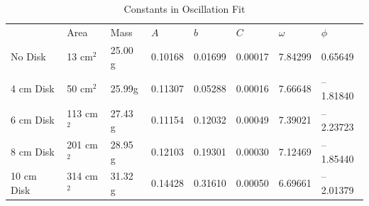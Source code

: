 \documentclass[12pt,letterpaper]{article}
\begin{document}
\begin{table}[ht]
\centering
\begin{tabular}{llllllll}
                                & Area                            & Mass                         & $A$                          & $b$                          & $C$                          & $\omega$                     & $\phi$                        \\ \cline{2-8} 
\multicolumn{1}{l|}{No Disk}    & \multicolumn{1}{l|}{13 cm$^2$}  & \multicolumn{1}{l|}{25.00 g} & \multicolumn{1}{l|}{0.10168} & \multicolumn{1}{l|}{0.01699} & \multicolumn{1}{l|}{0.00017} & \multicolumn{1}{l|}{7.84299} & \multicolumn{1}{l|}{0.65649}  \\ \cline{2-8} 
\multicolumn{1}{l|}{4 cm Disk}  & \multicolumn{1}{l|}{50 cm$^2$}  & \multicolumn{1}{l|}{25.99g}  & \multicolumn{1}{l|}{0.11307} & \multicolumn{1}{l|}{0.05288} & \multicolumn{1}{l|}{0.00016} & \multicolumn{1}{l|}{7.66648} & \multicolumn{1}{l|}{–1.81840} \\ \cline{2-8} 
\multicolumn{1}{l|}{6 cm Disk}  & \multicolumn{1}{l|}{113 cm$^2$} & \multicolumn{1}{l|}{27.43 g} & \multicolumn{1}{l|}{0.11154} & \multicolumn{1}{l|}{0.12032} & \multicolumn{1}{l|}{0.00049} & \multicolumn{1}{l|}{7.39021} & \multicolumn{1}{l|}{–2.23723} \\ \cline{2-8} 
\multicolumn{1}{l|}{8 cm Disk}  & \multicolumn{1}{l|}{201 cm$^2$} & \multicolumn{1}{l|}{28.95 g} & \multicolumn{1}{l|}{0.12103} & \multicolumn{1}{l|}{0.19301} & \multicolumn{1}{l|}{0.00030} & \multicolumn{1}{l|}{7.12469} & \multicolumn{1}{l|}{–1.85440} \\ \cline{2-8} 
\multicolumn{1}{l|}{10 cm Disk} & \multicolumn{1}{l|}{314 cm$^2$} & \multicolumn{1}{l|}{31.32 g} & \multicolumn{1}{l|}{0.14428} & \multicolumn{1}{l|}{0.31610} & \multicolumn{1}{l|}{0.00050} & \multicolumn{1}{l|}{6.69661} & \multicolumn{1}{l|}{–2.01379} \\ \cline{2-8} 
\end{tabular}
\caption{Constants in Oscillation Fit}
\label{tab:oscillation}
\end{table}
\end{document}
